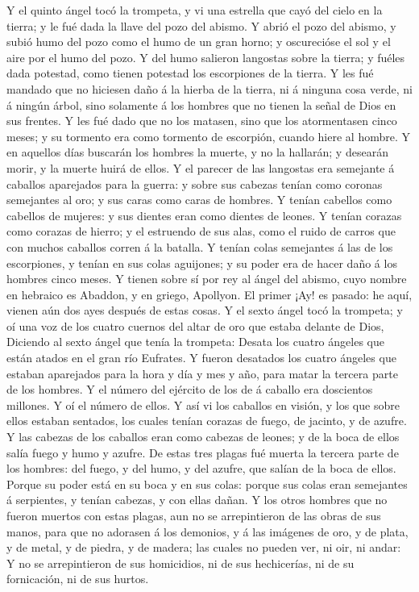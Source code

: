  Y el quinto ángel tocó la trompeta, y vi una estrella que
cayó del cielo en la tierra; y le fué dada la llave del pozo del abismo.
 Y abrió el pozo del abismo, y subió humo del pozo como el
humo de un gran horno; y oscurecióse el sol y el aire por el humo del
pozo.  Y del humo salieron langostas sobre la tierra; y
fuéles dada potestad, como tienen potestad los escorpiones de la tierra.
 Y les fué mandado que no hiciesen daño á la hierba de la
tierra, ni á ninguna cosa verde, ni á ningún árbol, sino solamente á los
hombres que no tienen la señal de Dios en sus frentes.  Y
les fué dado que no los matasen, sino que los atormentasen cinco meses;
y su tormento era como tormento de escorpión, cuando hiere al hombre.
 Y en aquellos días buscarán los hombres la muerte, y no
la hallarán; y desearán morir, y la muerte huirá de ellos.
 Y el parecer de las langostas era semejante á caballos
aparejados para la guerra: y sobre sus cabezas tenían como coronas
semejantes al oro; y sus caras como caras de hombres.  Y
tenían cabellos como cabellos de mujeres: y sus dientes eran como
dientes de leones.  Y tenían corazas como corazas de
hierro; y el estruendo de sus alas, como el ruido de carros que con
muchos caballos corren á la batalla.  Y tenían colas
semejantes á las de los escorpiones, y tenían en sus colas aguijones; y
su poder era de hacer daño á los hombres cinco meses.  Y
tienen sobre sí por rey al ángel del abismo, cuyo nombre en hebraico es
Abaddon, y en griego, Apollyon.  El primer ¡Ay! es
pasado: he aquí, vienen aún dos ayes después de estas cosas.
 Y el sexto ángel tocó la trompeta; y oí una voz de los
cuatro cuernos del altar de oro que estaba delante de Dios,
 Diciendo al sexto ángel que tenía la trompeta: Desata
los cuatro ángeles que están atados en el gran río Eufrates.
 Y fueron desatados los cuatro ángeles que estaban
aparejados para la hora y día y mes y año, para matar la tercera parte
de los hombres.  Y el número del ejército de los de á
caballo era doscientos millones. Y oí el número de ellos.
 Y así vi los caballos en visión, y los que sobre ellos
estaban sentados, los cuales tenían corazas de fuego, de jacinto, y de
azufre. Y las cabezas de los caballos eran como cabezas de leones; y de
la boca de ellos salía fuego y humo y azufre.  De estas
tres plagas fué muerta la tercera parte de los hombres: del fuego, y del
humo, y del azufre, que salían de la boca de ellos. 
Porque su poder está en su boca y en sus colas: porque sus colas eran
semejantes á serpientes, y tenían cabezas, y con ellas dañan.
 Y los otros hombres que no fueron muertos con estas
plagas, aun no se arrepintieron de las obras de sus manos, para que no
adorasen á los demonios, y á las imágenes de oro, y de plata, y de
metal, y de piedra, y de madera; las cuales no pueden ver, ni oir, ni
andar:  Y no se arrepintieron de sus homicidios, ni de
sus hechicerías, ni de su fornicación, ni de sus hurtos.

